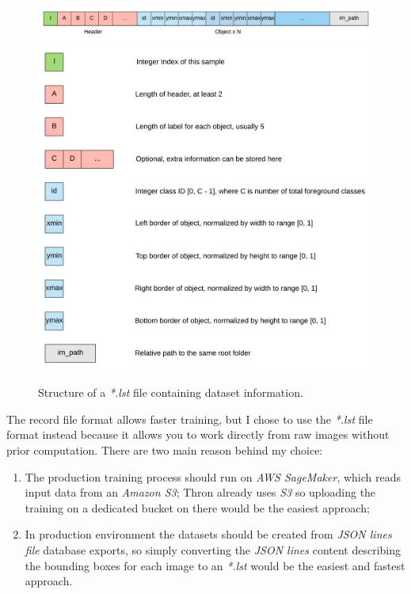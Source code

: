 \begin{figure}[htbp]
\begin{center}
\includegraphics[width=\textwidth]{immagini/pictures/detection_label.png}
\includegraphics[width=\textwidth]{immagini/pictures/detection_label_detail.png} 
\caption{Structure of a \emph{*.lst} file containing dataset information.}
\end{center}
\end{figure}

The record file format allows faster training, but I chose to use the \emph{*.lst} file format instead because it allows you to work directly from raw images without prior computation. There are two main reason behind my choice:
\begin{enumerate}
	\item The production training process should run on \emph{AWS SageMaker}, which reads input data from an \emph{Amazon S3}; Thron already uses \emph{S3} so uploading the training on a dedicated bucket on there would be the easiest approach;
	\item In production environment the datasets should be created from \emph{JSON lines file} database exports, so simply converting the \emph{JSON lines} content describing the bounding boxes for each image to an \emph{*.lst} would be the easiest and fastest approach.
\end{enumerate}



